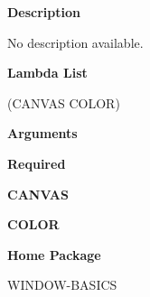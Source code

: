  
{\bf Description}

No description available.

 
{\bf Lambda List}

(CANVAS COLOR)

 
{\bf Arguments}


\beginhang
{\bf Required}\hspace{2em}
 
{\bf CANVAS}


 
{\bf COLOR}


 
\endhang
 
{\bf Home Package}

WINDOW-BASICS

